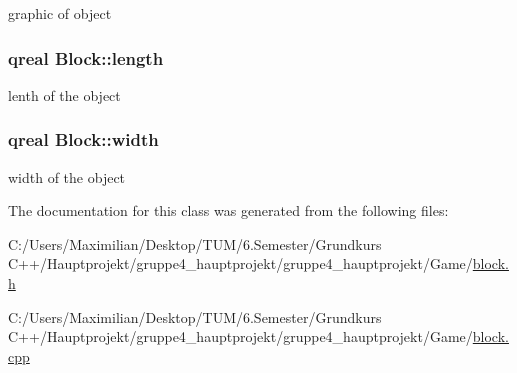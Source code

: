 graphic of object 

\subsubsection[{\texorpdfstring{length}{length}}]{\setlength{\rightskip}{0pt plus 5cm}qreal Block\+::length}\hypertarget{class_block_a7ad40ed8c8d961b1ca2117835853a9c5}{}\label{class_block_a7ad40ed8c8d961b1ca2117835853a9c5}


lenth of the object 

\subsubsection[{\texorpdfstring{width}{width}}]{\setlength{\rightskip}{0pt plus 5cm}qreal Block\+::width}\hypertarget{class_block_af7693d02f586bf02df6181995a66b768}{}\label{class_block_af7693d02f586bf02df6181995a66b768}


width of the object 



The documentation for this class was generated from the following files\+:\begin{DoxyCompactItemize}
\item 
C\+:/\+Users/\+Maximilian/\+Desktop/\+T\+U\+M/6.\+Semester/\+Grundkurs C++/\+Hauptprojekt/gruppe4\+\_\+hauptprojekt/gruppe4\+\_\+hauptprojekt/\+Game/\hyperlink{block_8h}{block.\+h}\item 
C\+:/\+Users/\+Maximilian/\+Desktop/\+T\+U\+M/6.\+Semester/\+Grundkurs C++/\+Hauptprojekt/gruppe4\+\_\+hauptprojekt/gruppe4\+\_\+hauptprojekt/\+Game/\hyperlink{block_8cpp}{block.\+cpp}\end{DoxyCompactItemize}
